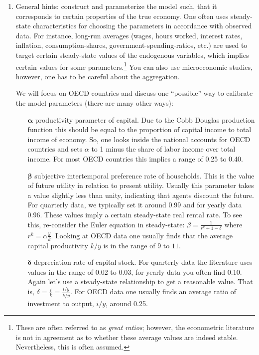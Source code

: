 \begin{enumerate}
\item
General hints: construct and parameterize the model such, that it corresponds to certain properties of the true economy.
One often uses steady-state characteristics for choosing the parameters in accordance with observed data.
For instance, long-run averages (wages, hours worked, interest rates, inflation, consumption-shares, government-spending-ratios, etc.) are used 
  to target certain steady-state values of the endogenous variables,
  which implies certain values for some parameters.\footnote{%
  These are often referred to as \emph{great ratios};
    however, the econometric literature is not in agreement as to whether these average values are indeed stable.
  Nevertheless, this is often assumed.
}
You can also use microeconomic studies, however, one has to be careful about the aggregation.
			
We will focus on OECD countries and discuss one \enquote{possible} way to calibrate the model parameters (there are many other ways):

\begin{itemize}

\item[\(\boldsymbol{\alpha}\)] productivity parameter of capital.
Due to the Cobb Douglas production function this should be equal to the proportion of capital income to total income of economy.
So, one looks inside the national accounts for OECD countries and sets \(\alpha \) to 1 minus the share of labor income over total income.
For most OECD countries this implies a range of 0.25 to 0.40.

\item[\(\boldsymbol{\beta}\)] subjective intertemporal preference rate of households.
This is the value of future utility in relation to present utility.
Usually this parameter takes a value slightly less than unity, indicating that agents discount the future.
For quarterly data, we typically set it around 0.99 and for yearly data 0.96.
These values imply a certain steady-state real rental rate.
To see this, re-consider the Euler equation in steady-state:
\(\beta = \frac{1}{r^{k}+1-\delta}\) where \(r^{k} = \alpha \frac{y}{k}\).
Looking at OECD data one usually finds that the average capital productivity \(k/y\) is in the range of \(9\) to \(11\).

\item[\(\boldsymbol{\delta}\)] depreciation rate of capital stock.
For quarterly data the literature uses values in the range of 0.02 to 0.03, for yearly data you often find 0.10.
Again let's use a steady-state relationship to get a reasonable value.
That is, \(\delta=\frac{i}{k}=\frac{i/y}{k/y}\).
For OECD data one usually finds an average ratio of investment to output, \(i/y\), around 0.25.


\end{itemize}
\end{enumerate}
